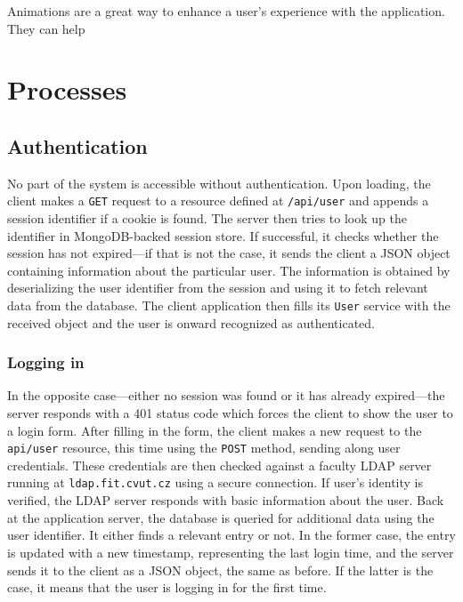 \documentclass[thesis=M,english,hidelinks]{FITthesis}[2012/10/20]
\newcommand{\code}{\texttt}
\begin{document}
Animations are a great way to enhance a user's experience with the application. They can help

\chapter{Processes}

  \section{Authentication}

No part of the system is accessible without authentication. Upon loading, the client makes a \code{GET} request to a resource defined at \code{/api/user} and appends a session identifier if a cookie is found. The server then tries to look up the identifier in MongoDB-backed session store. If successful, it checks whether the session has not expired---if that is not the case, it sends the client a JSON object containing information about the particular user. The information is obtained by deserializing the user identifier from the session and using it to fetch relevant data from the database. The client application then fills its \code{User} service with the received object and the user is onward recognized as authenticated.

    \subsection{Logging in}

In the opposite case---either no session was found or it has already expired---the server responds with a 401 status code which forces the client to show the user to a login form. After filling in the form, the client makes a new request to the \code{api/user} resource, this time using the \code{POST} method, sending along user credentials. These credentials are then checked against a faculty LDAP server running at \code{ldap.fit.cvut.cz} using a secure connection. If user's identity is verified, the LDAP server responds with basic information about the user. Back at the application server, the database is queried for additional data using the user identifier. It either finds a relevant entry or not. In the former case, the entry is updated with a new timestamp, representing the last login time, and the server sends it to the client as a JSON object, the same as before. If the latter is the case, it means that the user is logging in for the first time.
\end{document}
